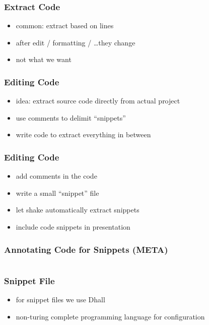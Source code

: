 \documentclass{beamer}
\begin{document}
\begin{frame}[fragile]
  \frametitle{Extract Code}
  \begin{itemize}
  \item common: extract based on lines
  \item after edit / formatting / \ldots they change
  \item not what we want
  \end{itemize}
\end{frame}

\begin{frame}
  \frametitle{Editing Code}
  \begin{itemize}
  \item idea: extract source code directly from actual project
  \item use comments to delimit ``snippets''
  \item write code to extract everything in between
  \end{itemize}
\end{frame}

\begin{frame}
  \frametitle{Editing Code}
  \begin{itemize}
  \item add comments in the code
  \item write a small ``snippet'' file
  \item let shake automatically extract snippets
  \item include code snippets in presentation
  \end{itemize}
\end{frame}

\begin{frame}
  \frametitle{Annotating Code for Snippets (META)}
  \begin{center}
    \inputminted[autogobble]{haskell}{snippets/outer-pdf-rule.hs}
  \end{center}
\end{frame}

\begin{frame}
  \frametitle{Snippet File}
  \begin{itemize}
  \item for snippet files we use Dhall
  \item non-turing complete programming language for configuration
  \end{itemize}
  \begin{center}
    \inputminted{text}{snippets/pdf-rule.snippet}
  \end{center}
\end{frame}
\end{document}
